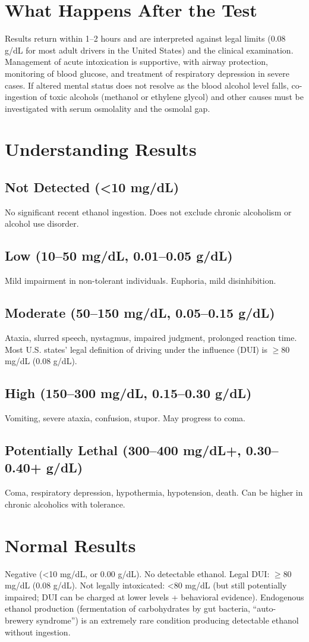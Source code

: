 \section*{What Happens After the Test}
Results return within 1--2 hours and are interpreted against legal limits (0.08 g/dL for most adult drivers in the United States) and the clinical examination. Management of acute intoxication is supportive, with airway protection, monitoring of blood glucose, and treatment of respiratory depression in severe cases. If altered mental status does not resolve as the blood alcohol level falls, co-ingestion of toxic alcohols (methanol or ethylene glycol) and other causes must be investigated with serum osmolality and the osmolal gap.
\section*{Understanding Results}
\subsection*{Not Detected (<10 mg/dL)}
No significant recent ethanol ingestion. Does not exclude chronic alcoholism or alcohol use disorder.
\subsection*{Low (10--50 mg/dL, 0.01--0.05 g/dL)}
Mild impairment in non-tolerant individuals. Euphoria, mild disinhibition.
\subsection*{Moderate (50--150 mg/dL, 0.05--0.15 g/dL)}
Ataxia, slurred speech, nystagmus, impaired judgment, prolonged reaction time. Most U.S. states' legal definition of driving under the influence (DUI) is $\geq$80 mg/dL (0.08 g/dL).
\subsection*{High (150--300 mg/dL, 0.15--0.30 g/dL)}
Vomiting, severe ataxia, confusion, stupor. May progress to coma.
\subsection*{Potentially Lethal (300--400 mg/dL+, 0.30--0.40+ g/dL)}
Coma, respiratory depression, hypothermia, hypotension, death. Can be higher in chronic alcoholics with tolerance.
\section*{Normal Results}
Negative (<10 mg/dL, or 0.00 g/dL). No detectable ethanol. Legal DUI: $\geq$80 mg/dL (0.08 g/dL). Not legally intoxicated: <80 mg/dL (but still potentially impaired; DUI can be charged at lower levels + behavioral evidence). Endogenous ethanol production (fermentation of carbohydrates by gut bacteria, ``auto-brewery syndrome'') is an extremely rare condition producing detectable ethanol without ingestion.
